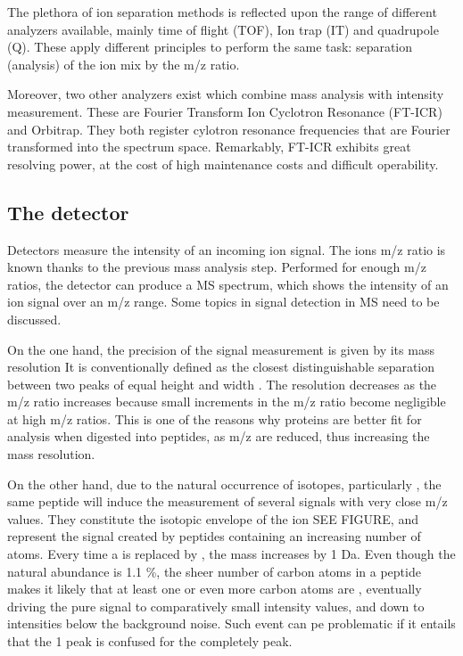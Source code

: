 \documentclass[11pt, a4paper]{report}
\begin{document}
The plethora of ion separation methods is reflected upon the range of different analyzers available, mainly time of flight (\ac{TOF}), Ion trap (\ac{IT}) and quadrupole (\ac{Q}). These apply different principles to perform the same task: separation (analysis) of the ion mix by the \ac{m/z} ratio.

Moreover, two other analyzers exist which combine mass analysis with intensity measurement. These are Fourier Transform Ion Cyclotron Resonance (\ac{FT-ICR}) and Orbitrap. They both register cylotron resonance frequencies that are Fourier transformed into the spectrum space. Remarkably, \ac{FT-ICR} exhibits great resolving power, at the cost of high maintenance costs and difficult operability. 

\subsection{The detector}
\label{subsec:the_detector}

Detectors measure the intensity of an incoming ion signal. The ion\textquotesingle s \ac{m/z} ratio is known thanks to the previous mass analysis step. Performed for enough \ac{m/z} ratios, the detector can produce a \ac{MS} spectrum, which shows the intensity of an ion signal over an \ac{m/z} range. Some topics in signal detection in \ac{MS} need to be discussed.

On the one hand, the precision of the signal measurement is given by its mass resolution It is conventionally defined as the closest distinguishable separation between two peaks of equal height and width \cite{Marshall2013}. The resolution decreases as the \ac{m/z} ratio increases because small increments in the \ac{m/z} ratio become negligible at high \ac{m/z} ratios. This is one of the reasons why proteins are better fit for analysis when digested into peptides, as \ac{m/z} are reduced, thus increasing the mass resolution.

On the other hand, due to the natural occurrence of isotopes, particularly , the same peptide will induce the measurement of several signals with very close \ac{m/z} values. They constitute the isotopic envelope of the ion SEE FIGURE, and represent the signal created by peptides containing an increasing number of  atoms. Every time a  is replaced by , the mass increases by 1 Da. Even though the natural abundance is 1.1 \%, the sheer number of carbon atoms in a peptide makes it likely that at least one or even more carbon atoms are , eventually driving the pure  signal to comparatively small intensity values, and down to intensities below the background noise. Such event can pe problematic if it entails that the 1  peak is confused for the completely  peak.
\end{document}
